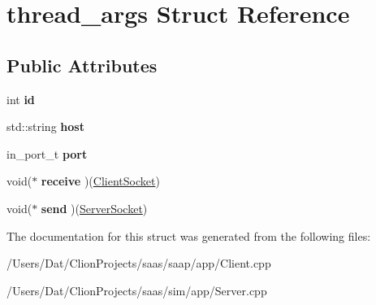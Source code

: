 \hypertarget{structthread__args}{}\section{thread\+\_\+args Struct Reference}
\label{structthread__args}
\subsection*{Public Attributes}
\begin{DoxyCompactItemize}
\item 
int {\bfseries id}\hypertarget{structthread__args_a6322b3468fd88f8f49977a6439e9f352}{}\label{structthread__args_a6322b3468fd88f8f49977a6439e9f352}

\item 
std\+::string {\bfseries host}\hypertarget{structthread__args_a2993a11951278a8e5277b45ac9547d00}{}\label{structthread__args_a2993a11951278a8e5277b45ac9547d00}

\item 
in\+\_\+port\+\_\+t {\bfseries port}\hypertarget{structthread__args_aec0f2f19bebb0641a7a635ad70376db3}{}\label{structthread__args_aec0f2f19bebb0641a7a635ad70376db3}

\item 
void($\ast$ {\bfseries receive} )(\hyperlink{class_client_socket}{Client\+Socket})\hypertarget{structthread__args_a44ed1c0214dc37f162e77dbe0f9dd5fb}{}\label{structthread__args_a44ed1c0214dc37f162e77dbe0f9dd5fb}

\item 
void($\ast$ {\bfseries send} )(\hyperlink{class_server_socket}{Server\+Socket})\hypertarget{structthread__args_a32fa5ab6ec80d4ee564930d62027fd93}{}\label{structthread__args_a32fa5ab6ec80d4ee564930d62027fd93}

\end{DoxyCompactItemize}


The documentation for this struct was generated from the following files\+:\begin{DoxyCompactItemize}
\item 
/\+Users/\+Dat/\+Clion\+Projects/saas/saap/app/Client.\+cpp\item 
/\+Users/\+Dat/\+Clion\+Projects/saas/sim/app/Server.\+cpp\end{DoxyCompactItemize}

